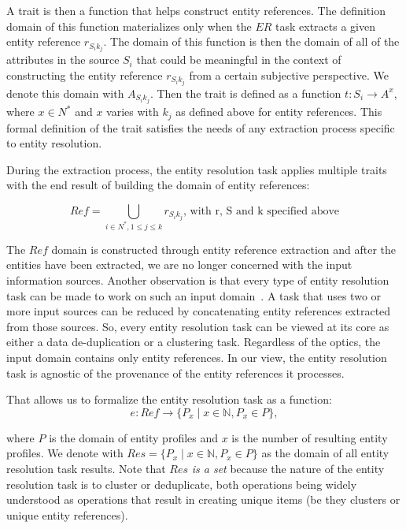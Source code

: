 \documentclass[lettersize,journal]{IEEEtran}
\begin{document}
    A trait is then a function that helps construct entity references.
    The definition domain of this function materializes only when the $ER$ task
    extracts a given entity reference $r_{{S_i}{k_j}}$.
    The domain of this function is then the domain of all of the attributes in
    the source $S_i$ that could be meaningful in the context of constructing the
    entity reference $r_{{S_i}{k_j}}$ from a certain subjective perspective.
    We denote this domain with $A_{{S_i}{k_j}}$.
    Then the trait is defined as a function $t: S_i \rightarrow A^x$, where
    $x \in N^*$ and $x$ varies with $k_j$ as defined above for entity
    references.
    This formal definition of the trait satisfies the needs of any extraction
    process specific to entity resolution.

    During the extraction process, the entity resolution task applies multiple
    traits with the end result of building the domain of entity references:

    \[
        Ref = \bigcup_{i \in N^*,1 \leq j \leq k} r_{{S_i}{k_j}}
        \textrm{, with r, S and k specified above}
    \]

    The $Ref$ domain is constructed through entity reference extraction and
    after the entities have been extracted, we are no longer concerned with the
    input information sources.
    Another observation is that every type of entity resolution task can be made
    to work on such an input domain~\cite{Pap19}.
    A task that uses two or more input sources can be reduced by concatenating
    entity references extracted from those sources.
    So, every entity resolution task can be viewed at its core as either a
    data de-duplication or a clustering task.
    Regardless of the optics, the input domain contains only entity references.
    In our view, the entity resolution task is agnostic of the provenance of the
    entity references it processes.
    
    That allows us to formalize the entity resolution task as a function:
    \[
        e : Ref \rightarrow \{P_x \mid x \in \mathbb{N}, P_x \in P \},
    \]
    
    where $P$ is the domain of entity profiles and $x$ is the number of
    resulting entity profiles.
    We denote with $Res=\{P_x \mid x \in \mathbb{N}, P_x \in P\}$ as the domain
    of all entity resolution task results.
    Note that $Res$ \textit{is a set} because the nature of the entity
    resolution task is to cluster or deduplicate, both operations being widely
    understood as operations that result in creating unique items (be they
    clusters or unique entity references).
\end{document}
